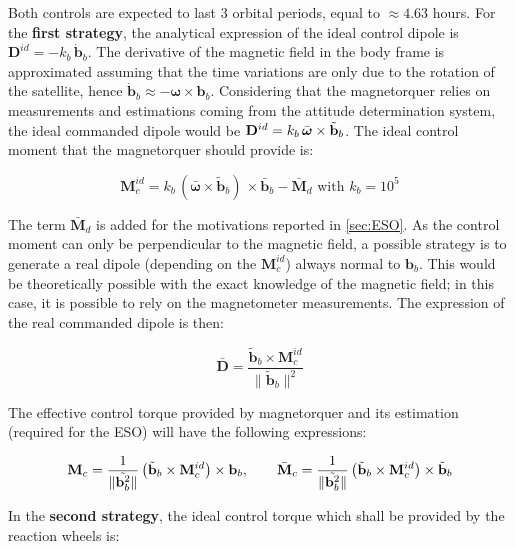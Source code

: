 Both controls are expected to last 3 orbital periods, equal to $\approx 4.63$ hours. For the \textbf{first strategy}, the analytical expression of the ideal control dipole is $\mathbf{D}^{id} = - k_b\, \Dot{\mathbf{b}}_b$. The derivative of the magnetic field in the body frame is approximated assuming that the time variations are only due to the rotation of the satellite, hence $\dot{\mathbf{b}}_b \approx - \bm{\omega} \times \mathbf{b}_b$. Considering that the magnetorquer relies on measurements and estimations coming from the attitude determination system, the ideal commanded dipole would be $\mathbf{D}^{id} = k_b \, \Bar{\bm{\omega}} \times \Tilde{\mathbf{b}}_b$. The ideal control moment that the magnetorquer should provide is:

\begin{equation}
    \mathbf{M}_c^{id} = k_b \,(\bar{\bm{\omega}} \times \tilde{\mathbf{b}}_b)\, \times \bar{\mathbf{b}}_b - \bar{\mathbf{M}}_d \text{ with } k_b = 10^5
\end{equation}

The term $\bar{\mathbf{M}}_d$ is added for the motivations reported in \cref{sec:ESO}. As the control moment can only be perpendicular to the magnetic field, a possible strategy is to generate a real dipole (depending on the $\mathbf{M}_c^{id}$) always normal to $\mathbf{b}_b$. This would be theoretically possible with the exact knowledge of the magnetic field; in this case, it is possible to rely on the magnetometer measurements. The expression of the real commanded dipole is then:

\begin{equation}
    \bar{\mathbf{D}} = \frac{\tilde{\mathbf{b}}_b \times \mathbf{M}_c^{id}}{\| \tilde{\mathbf{b}}_b \|^2}
\end{equation}

The effective control torque provided by magnetorquer and its estimation (required for the ESO) will have the following expressions:

\begin{equation}
    \mathbf{M}_c = \frac{1}{\|\Tilde{\mathbf{b}_b^2}\|} \left( \Tilde{\mathbf{b}}_b \times \mathbf{M}_c^{id} \right) \times \mathbf{b}_b , \qquad \bar{\mathbf{M}}_c = \frac{1}{\|\Tilde{\mathbf{b}_b^2}\|} \left( \Tilde{\mathbf{b}}_b \times \mathbf{M}_c^{id} \right) \times \Tilde{\mathbf{b}}_b
\end{equation}

In the \textbf{second strategy}, the ideal control torque which shall be provided by the reaction wheels is:

